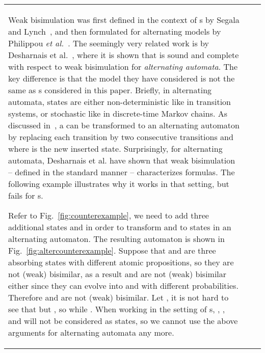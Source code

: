 \documentclass{LMCS}
\begin{document}
\begin{table}
\begin{tabular}{|l|c|c|}
Weak bisimulation was first defined in the context of s by
Segala and Lynch~\cite{SegalaL95}, and then formulated for alternating models by
Philippou \emph{et al.}~\cite{PhilippouLS00}.
The seemingly very related work is by Desharnais et
al.~\cite{DesharnaisGJP10}, where it is shown that  is sound and
complete with respect to weak bisimulation for \emph{alternating
automata}. The key difference is that the model they have considered is not
the same as s considered in this paper. Briefly,
in alternating automata, states are either non-deterministic like in
transition systems, or stochastic like in discrete-time Markov chains.
As discussed in~\cite{SegalaT05}, a  can be
transformed to an alternating automaton by replacing each transition
 by two consecutive transitions 
and  where  is the new inserted
state. Surprisingly, for alternating automata, Desharnais et al. have
shown that weak bisimulation -- defined in the standard manner --
characterizes  formulas. The following example illustrates why it
works in that setting, but fails for s.
\begin{exa}\label{ex:alternative PA}
  Refer to Fig.~\ref{fig:counterexample}, we need to add three
  additional states  and  in order to
  transform  and  to states in an alternating automaton. 
  The resulting
  automaton is shown in Fig.~\ref{fig:altercounterexample}.  Suppose
  that  and  are three absorbing states with different
  atomic propositions, so they are not (weak) bisimilar, as a result
   and  are not (weak) bisimilar
  either since they can evolve into  and  with
  different probabilities. Therefore  and  are not (weak)
  bisimilar. Let , it is
  not hard to see that  but
  , so  while . When
  working in the setting of s, ,
  , and  will not be considered as states, so we
  cannot use the above arguments for alternating automata any more.
\end{exa}


\end{tabular}
\end{table}
\end{document}
